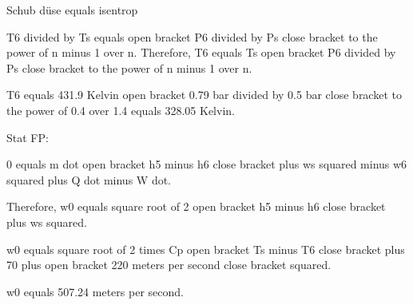 Schub düse equals isentrop

T6 divided by Ts equals open bracket P6 divided by Ps close bracket to the power of n minus 1 over n. Therefore, T6 equals Ts open bracket P6 divided by Ps close bracket to the power of n minus 1 over n. 

T6 equals 431.9 Kelvin open bracket 0.79 bar divided by 0.5 bar close bracket to the power of 0.4 over 1.4 equals 328.05 Kelvin.

Stat FP:

0 equals m dot open bracket h5 minus h6 close bracket plus ws squared minus w6 squared plus Q dot minus W dot.

Therefore, w0 equals square root of 2 open bracket h5 minus h6 close bracket plus ws squared.

w0 equals square root of 2 times Cp open bracket Ts minus T6 close bracket plus 70 plus open bracket 220 meters per second close bracket squared.

w0 equals 507.24 meters per second.